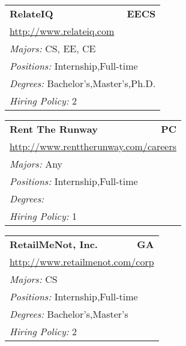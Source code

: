 \documentclass[twoside]{article}
\begin{document}
\begin{center}
\begin{multicols}{3}
\begin{FlushLeft}
\begin{minipage}{.9\columnwidth}
\end{minipage}
 
\begin{minipage}{.9\columnwidth}\begin{tabularx}{.95\columnwidth}{Xr}
                 {\Large\bf RelateIQ} & {\Large\bf EECS}\\
    \multicolumn{2}{p{.95\columnwidth}}{\url{http://www.relateiq.com}}\\
    \multicolumn{2}{p{.95\columnwidth}}{\emph{Majors:} CS, EE, CE}\\
    \multicolumn{2}{p{.95\columnwidth}}{\emph{Positions:} Internship,Full-time}\\
    \multicolumn{2}{p{.95\columnwidth}}{\emph{Degrees:} Bachelor's,Master's,Ph.D.}\\
    \multicolumn{2}{p{.95\columnwidth}}{\emph{Hiring Policy:} 2}\\
    \end{tabularx}
    
\end{minipage}
 
\begin{minipage}{.9\columnwidth}\begin{tabularx}{.95\columnwidth}{Xr}
                 {\Large\bf Rent The Runway} & {\Large\bf PC}\\
    \multicolumn{2}{p{.95\columnwidth}}{\url{http://www.renttherunway.com/careers}}\\
    \multicolumn{2}{p{.95\columnwidth}}{\emph{Majors:} Any}\\
    \multicolumn{2}{p{.95\columnwidth}}{\emph{Positions:} Internship,Full-time}\\
    \multicolumn{2}{p{.95\columnwidth}}{\emph{Degrees:} }\\
    \multicolumn{2}{p{.95\columnwidth}}{\emph{Hiring Policy:} 1}\\
    \end{tabularx}
    
\end{minipage}
 
\begin{minipage}{.9\columnwidth}\begin{tabularx}{.95\columnwidth}{Xr}
                 {\Large\bf RetailMeNot, Inc.} & {\Large\bf GA}\\
    \multicolumn{2}{p{.95\columnwidth}}{\url{http://www.retailmenot.com/corp}}\\
    \multicolumn{2}{p{.95\columnwidth}}{\emph{Majors:} CS}\\
    \multicolumn{2}{p{.95\columnwidth}}{\emph{Positions:} Internship,Full-time}\\
    \multicolumn{2}{p{.95\columnwidth}}{\emph{Degrees:} Bachelor's,Master's}\\
    \multicolumn{2}{p{.95\columnwidth}}{\emph{Hiring Policy:} 2}\\
    \end{tabularx}
    

\end{minipage}
\end{FlushLeft}
\end{multicols}
\end{center}
\end{document}
